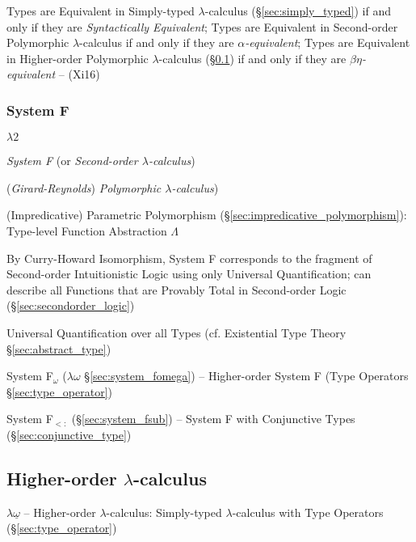 Types are Equivalent in Simply-typed $\lambda$-calculus
(\S\ref{sec:simply_typed}) if and only if they are \emph{Syntactically
  Equivalent}; Types are Equivalent in Second-order Polymorphic
$\lambda$-calculus if and only if they are \emph{$\alpha$-equivalent};
Types are Equivalent in Higher-order Polymorphic $\lambda$-calculus
(\S\ref{sec:higherorder_lambda}) if and only if they are
\emph{$\beta\eta$-equivalent} -- (Xi16)



\subsubsection{System F}\label{sec:system_f}

$\lambda2$

\emph{System F} (or \emph{Second-order $\lambda$-calculus})

(\emph{Girard-Reynolds}) \emph{Polymorphic $\lambda$-calculus})

(Impredicative) Parametric Polymorphism
(\S\ref{sec:impredicative_polymorphism}): Type-level Function
Abstraction $\Lambda$

By Curry-Howard Isomorphism, System F corresponds to the fragment of
Second-order Intuitionistic Logic using only Universal Quantification;
can describe all Functions that are Provably Total in Second-order
Logic (\S\ref{sec:secondorder_logic})

Universal Quantification over all Types (cf. Existential Type Theory
\S\ref{sec:abstract_type}) %



System F$_\omega$ ($\lambda\omega$ \S\ref{sec:system_fomega}) --
  Higher-order System F (Type Operators \S\ref{sec:type_operator})

System F$_{<:}$ (\S\ref{sec:system_fsub}) -- System F with
  Conjunctive Types (\S\ref{sec:conjunctive_type})



\subsection{Higher-order $\lambda$-calculus}
\label{sec:higherorder_lambda}

$\lambda\underline{\omega}$ -- Higher-order $\lambda$-calculus:
Simply-typed $\lambda$-calculus with Type Operators
(\S\ref{sec:type_operator})

